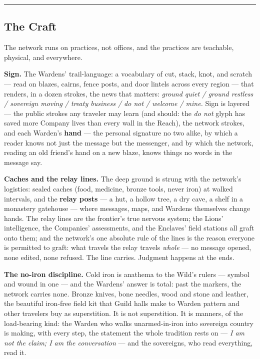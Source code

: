 \medskip\hrule\medskip

\subsection{The Craft}

The network runs on practices, not offices, and the practices are teachable, physical, and everywhere.

\textbf{Sign.} The Wardens' trail-language: a vocabulary of cut, stack, knot, and scratch --- read on blazes, cairns, fence posts, and door lintels across every region --- that renders, in a dozen strokes, the news that matters: \textit{ground quiet / ground restless / sovereign moving / treaty business / do not / welcome / mine.} Sign is layered --- the public strokes any traveler may learn (and should: the \textit{do not} glyph has saved more Company lives than every wall in the Reach), the network strokes, and each Warden's \textbf{hand} --- the personal signature no two alike, by which a reader knows not just the message but the messenger, and by which the network, reading an old friend's hand on a new blaze, knows things no words in the message say.

\textbf{Caches and the relay lines.} The deep ground is strung with the network's logistics: sealed caches (food, medicine, bronze tools, never iron) at walked intervals, and the \textbf{relay posts} --- a hut, a hollow tree, a dry cave, a shelf in a monastery gatehouse --- where messages, maps, and Wardens themselves change hands. The relay lines are the frontier's true nervous system; the Lions' intelligence, the Companies' assessments, and the Enclaves' field stations all graft onto them; and the network's one absolute rule of the lines is the reason everyone is permitted to graft: what travels the relay travels \textit{whole} --- no message opened, none edited, none refused. The line carries. Judgment happens at the ends.

\textbf{The no-iron discipline.} Cold iron is anathema to the Wild's rulers --- symbol and wound in one --- and the Wardens' answer is total: past the markers, the network carries none. Bronze knives, bone needles, wood and stone and leather, the beautiful iron-free field kit that Guild halls make to Warden pattern and other travelers buy as superstition. It is not superstition. It is manners, of the load-bearing kind: the Warden who walks unarmed-in-iron into sovereign country is making, with every step, the statement the whole tradition rests on --- \textit{I am not the claim; I am the conversation} --- and the sovereigns, who read everything, read it.

